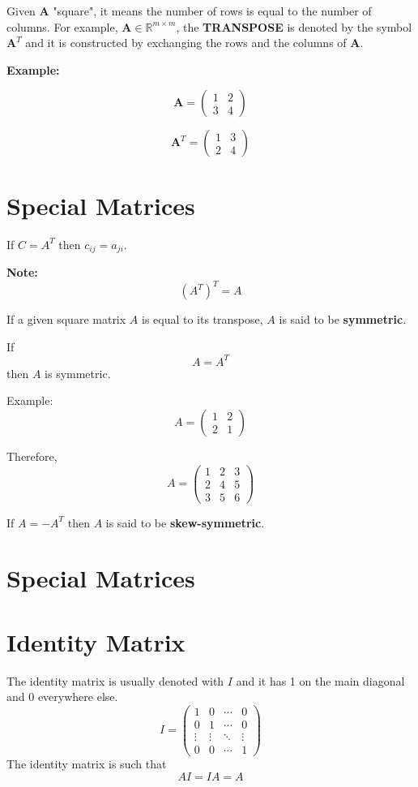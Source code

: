 Given $\mathbf{A}$ "square", it means the number of rows is equal to the number of columns. For example, $\mathbf{A} \in \mathbb{R}^{m \times m}$, the \textbf{TRANSPOSE} is denoted by the symbol $\mathbf{A}^T$ and it is constructed by exchanging the rows and the columns of $\mathbf{A}$.

\textbf{Example:}

\[
\mathbf{A} = 
\begin{pmatrix}
1 & 2 \\
3 & 4
\end{pmatrix}
\]

\[
\mathbf{A}^T = 
\begin{pmatrix}
1 & 3 \\
2 & 4
\end{pmatrix}
\]

\section{Special Matrices}





If $C = A^T$ then $c_{ij} = a_{ji}$.

\textbf{Note:}
\[(A^T)^T = A\]

If a given square matrix $A$ is equal to its transpose, $A$ is said to be \textbf{symmetric}.

If
\[A = A^T\]
then $A$ is symmetric.

Example:
\[A = \begin{pmatrix}
1 & 2 \\
2 & 1
\end{pmatrix}\]

Therefore,
\[A = \begin{pmatrix}
1 & 2 & 3 \\
2 & 4 & 5 \\
3 & 5 & 6
\end{pmatrix}\]

If $A = -A^T$ then $A$ is said to be \textbf{skew-symmetric}.

\section{Special Matrices}


\section{Identity Matrix}
The identity matrix is usually denoted with $I$ and it has 1 on the main diagonal and 0 everywhere else.
\[
I = \begin{pmatrix}
1 & 0 & \cdots & 0 \\
0 & 1 & \cdots & 0 \\
\vdots & \vdots & \ddots & \vdots \\
0 & 0 & \cdots & 1
\end{pmatrix}
\]
The identity matrix is such that
\[
AI = IA = A
\]

